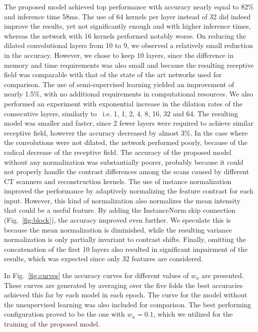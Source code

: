 \documentclass[journal]{IEEEtran}
\begin{document}
\begin{table}[]
\begin{tabular}{@{}llll@{}}
\bottomrule

\end{tabular}
\label{II}
\end{table}The proposed model achieved top performance with accuracy nearly equal to 82\% and inference time 58ms. The use of 64 kernels per layer instead of 32 did indeed improve the results, yet not significantly enough and with higher inference times, whereas the network with 16 kernels performed notably worse. On reducing the dilated convolutional layers from 10 to 9, we observed a relatively small reduction in the accuracy. However, we chose to keep 10 layers, since the difference in memory and time requirements was also small and because the resulting receptive field was comparable with that of the state of the art networks used for comparison. The use of semi-supervised learning yielded an improvement of nearly 1.5\%, with no additional requirements in computational resources. We also performed an experiment with exponential increase in the dilation rates of the consecutive layers, similarly to~\cite{YuDilatedSegm} i.e. 1, 1, 2, 4, 8, 16, 32 and 64. The resulting model was smaller and faster, since 2 fewer layers were required to achieve similar receptive field, however the accuracy decreased by almost 3\%. In the case where the convolutions were not dilated, the network performed poorly, because of the radical decrease of the receptive field. The accuracy of the proposed model without any normalization was substantially poorer, probably because it could not properly handle the contrast differences among the scans caused by different CT scanners and reconstruction kernels. The use of instance normalization improved the performance by adaptively normalizing the feature contrast for each input. However, this kind of normalization also normalizes the mean intensity that could be a useful feature. By adding the InstanceNorm skip connection (Fig.~\ref{fig:block}), the accuracy improved even further. We speculate this is because the mean normalization is diminished, while the resulting variance normalization is only partially invariant to contrast shifts. Finally, omitting the concatenation of the first 10 layers also resulted in significant impairment of the results, which was expected since only 32 features are considered. 

In Fig.~\ref{fig:curves} the accuracy curves for different values of $w_u$ are presented. These curves are generated by averaging over the five folds the best accuracies achieved this far by each model in each epoch. The curve for the model without the unsupervised learning was also included for comparison. The best performing configuration proved to be the one with $w_u=0.1$, which we utilized for the training of the proposed model.
\end{document}
